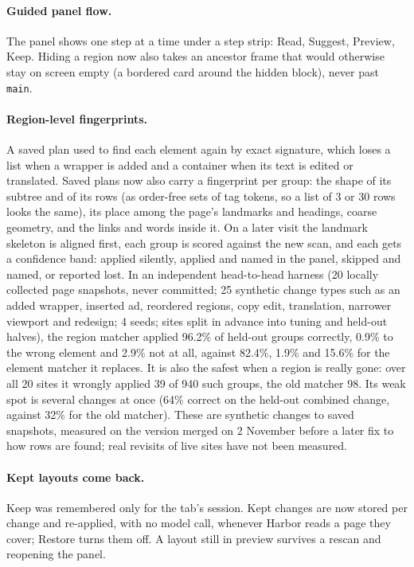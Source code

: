 \documentclass[10pt,a4paper]{article}
\begin{document}
\paragraph{Guided panel flow.} The panel shows one step at a time under a step strip: Read, Suggest, Preview, Keep. Hiding a region now also takes an ancestor frame that would otherwise stay on screen empty (a bordered card around the hidden block), never past \texttt{main}.

\paragraph{Region-level fingerprints.} A saved plan used to find each element again by exact signature, which loses a list when a wrapper is added and a container when its text is edited or translated. Saved plans now also carry a fingerprint per group: the shape of its subtree and of its rows (as order-free sets of tag tokens, so a list of 3 or 30 rows looks the same), its place among the page's landmarks and headings, coarse geometry, and the links and words inside it. On a later visit the landmark skeleton is aligned first, each group is scored against the new scan, and each gets a confidence band: applied silently, applied and named in the panel, skipped and named, or reported lost. In an independent head-to-head harness (20 locally collected page snapshots, never committed; 25 synthetic change types such as an added wrapper, inserted ad, reordered regions, copy edit, translation, narrower viewport and redesign; 4 seeds; sites split in advance into tuning and held-out halves), the region matcher applied 96.2\% of held-out groups correctly, 0.9\% to the wrong element and 2.9\% not at all, against 82.4\%, 1.9\% and 15.6\% for the element matcher it replaces. It is also the safest when a region is really gone: over all 20 sites it wrongly applied 39 of 940 such groups, the old matcher 98. Its weak spot is several changes at once (64\% correct on the held-out combined change, against 32\% for the old matcher). These are synthetic changes to saved snapshots, measured on the version merged on 2 November before a later fix to how rows are found; real revisits of live sites have not been measured.

\paragraph{Kept layouts come back.} Keep was remembered only for the tab's session. Kept changes are now stored per change and re-applied, with no model call, whenever Harbor reads a page they cover; Restore turns them off. A layout still in preview survives a rescan and reopening the panel.
\end{document}
